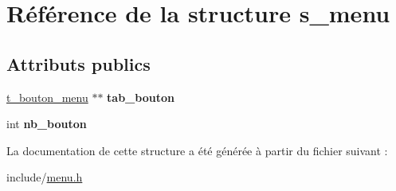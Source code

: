 \hypertarget{structs__menu}{}\section{Référence de la structure s\+\_\+menu}
\label{structs__menu}
\subsection*{Attributs publics}
\begin{DoxyCompactItemize}
\item 
\mbox{\label{structs__menu_a2db9c68c4c3320c6072e23b4b0468c61}} 
\hyperlink{structt__bouton__menu}{t\+\_\+bouton\+\_\+menu} $\ast$$\ast$ {\bfseries tab\+\_\+bouton}
\item 
\mbox{\label{structs__menu_a7f7706a4a3c786c0d6f9bcf2da68b075}} 
int {\bfseries nb\+\_\+bouton}
\end{DoxyCompactItemize}


La documentation de cette structure a été générée à partir du fichier suivant \+:\begin{DoxyCompactItemize}
\item 
include/\hyperlink{menu_8h}{menu.\+h}\end{DoxyCompactItemize}

